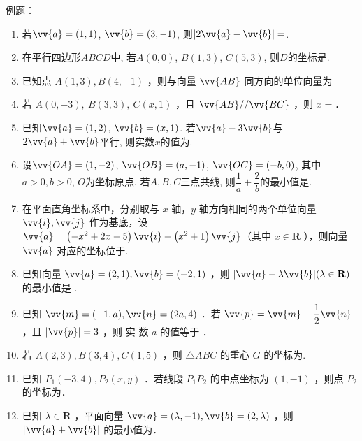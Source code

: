 例题：
\begin{enumerate}
    \item 若$\vv{a}=(1,1)$, $\vv{b}=(3,-1)$, 则$\vert2\vv{a}-\vv{b}\vert=$. 
    
    \item 在平行四边形$ABCD$中, 若$A(0,0)$, $B(1,3)$, $C(5,3)$, 则$D$的坐标是. 
    
    \item 已知点 $A(1,3), B(4,-1)$ ，则与向量 $\vv{A B}$ 同方向的单位向量为
    
    
    \item 若 $A(0,-3), ~ B(3,3), ~ C(x, 1)$ ，且 $\vv{A B} / / \vv{B C}$ ，则 $x=$．
    
    \item 已知$\vv{a}=(1,2)$, $\vv{b}=(x,1)$. 若$\vv{a}-3\vv{b}$与$2\vv{a}+\vv{b}$平行, 则实数$x$的值为. 
    
    \item 设$\vv{OA}=(1,-2)$, $\vv{OB}=(a,-1)$, $\vv{OC}=(-b,0)$, 其中$a>0,b>0$, $O$为坐标原点, 若$A,B,C$三点共线, 则$\dfrac{1}{a}+\dfrac{2}{b}$的最小值是. 
    
    
    \item 在平面直角坐标系中，分别取与 $x$ 轴，$y$ 轴方向相同的两个单位向量 $\vv{i}, \vv{j}$ 作为基底，设 $\vv{a}=\left(-x^2+2 x-5\right) \vv{i}+\left(x^2+1\right) \vv{j}$（其中 $x \in \mathbf{R}$ ），则向量 $\vv{a}$ 对应的坐标位于.
    
    
    \item 已知向量 $\vv{a}=(2,1), \vv{b}=(-2,1)$ ，则 $|\vv{a}-\lambda \vv{b}|(\lambda \in \mathbf{R})$的最小值是 .
    
    
    \item 已知 $\vv{m}=(-1, a), \vv{n}=(2 a, 4)$ ．若 $\vv{p}=\vv{m}+\dfrac{1}{2} \vv{n}$ ，且 $|\vv{p}|=3$ ，则 实 数 $a$ 的值等于  ．

    \item 若 $A(2,3), B(3,4), C(1,5)$ ，则 $\triangle A B C$ 的重心 $G$ 的坐标为.

    \item 已知 $P_1(-3,4), P_2(x, y)$ ．若线段 $P_1 P_2$ 的中点坐标为 $(1,-1)$ ，则点 $P_2$ 的坐标为．

    \item 已知 $\lambda \in \mathbf{R}$ ，平面向量 $\vv{a}=(\lambda,-1), \vv{b}=(2, \lambda)$ ，则 $|\vv{a}+\vv{b}|$ 的最小值为．


\end{enumerate}
